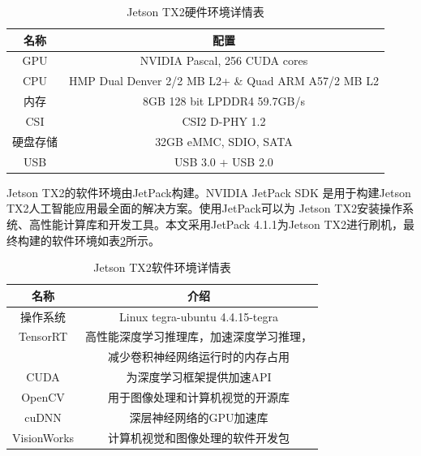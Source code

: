 {
    \begin{table}[htb] 
        \caption{Jetson TX2硬件环境详情表}
        \label{table:TX2:config}
        \centering
        \begin{tabular}[t]{c|c}
            \hline
            名称 & 配置  \\
            \hline
            GPU & NVIDIA Pascal, 256 CUDA cores  \\
            \hline
            CPU & HMP Dual Denver 2/2 MB L2+ \& Quad ARM A57/2 MB L2 \\
            \hline
            内存 & 8GB 128 bit LPDDR4 59.7GB/s\\
            \hline
            CSI & CSI2 D-PHY 1.2\\
            \hline 
            硬盘存储 & 32GB eMMC, SDIO, SATA\\
            \hline
            USB & USB 3.0 + USB 2.0 \\
            \hline
        \end{tabular} 
    \end{table}
}

Jetson TX2的软件环境由JetPack构建。NVIDIA JetPack SDK 是用于构建Jetson TX2人工智能应用最全面的解决方案。使用JetPack可以为
Jetson TX2安装操作系统、高性能计算库和开发工具。本文采用JetPack 4.1.1为Jetson TX2进行刷机，最终构建的软件环境如表\ref{table:TX2:software}所示。

{
    \begin{table}[htb] 
        \caption{Jetson TX2软件环境详情表}
        \label{table:TX2:software}
        \centering
        \begin{tabular}[t]{c|c}
            \hline
            名称 & 介绍  \\
            \hline
            操作系统 & Linux tegra-ubuntu 4.4.15-tegra\\
            \hline
            TensorRT & 高性能深度学习推理库，加速深度学习推理，\\
             & 减少卷积神经网络运行时的内存占用  \\
            \hline
            CUDA & 为深度学习框架提供加速API \\
            \hline
            OpenCV & 用于图像处理和计算机视觉的开源库\\
            \hline
            cuDNN & 深层神经网络的GPU加速库\\
            \hline 
            VisionWorks & 计算机视觉和图像处理的软件开发包\\
            \hline
        \end{tabular} 
    \end{table}
}

